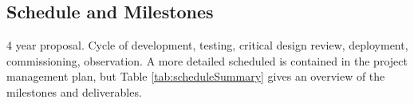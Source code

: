 \documentclass[preprint]{aastex}
\begin{document}

%


\subsection{Schedule and Milestones} %

4 year proposal.
Cycle of development, testing, critical design review, deployment, commissioning, observation.
A more detailed scheduled is contained in the project management plan, but Table \ref{tab:scheduleSummary} gives an overview
of the milestones and deliverables.
\end{document}
